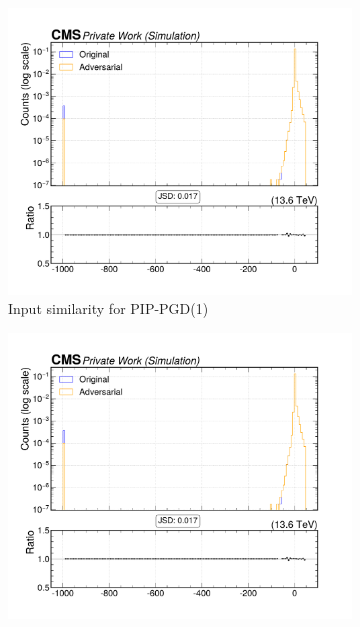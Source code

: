 \begin{figure}[htbp]
  \centering
  \begin{subfigure}[t]{0.32\textwidth}
    \includegraphics[width=\linewidth]{media/output/features/compare/combined_it_1/cmp_global_features_TagVarCSV_trackSip2dSigAboveCharm.pdf}
    \caption*{Input similarity for PIP-PGD(1)}
  \end{subfigure}\hfill
  \begin{subfigure}[t]{0.32\textwidth}
    \includegraphics[width=\linewidth]{media/output/features/compare/combined_it_2/cmp_global_features_TagVarCSV_trackSip2dSigAboveCharm.pdf}

\end{subfigure}
\end{figure}
